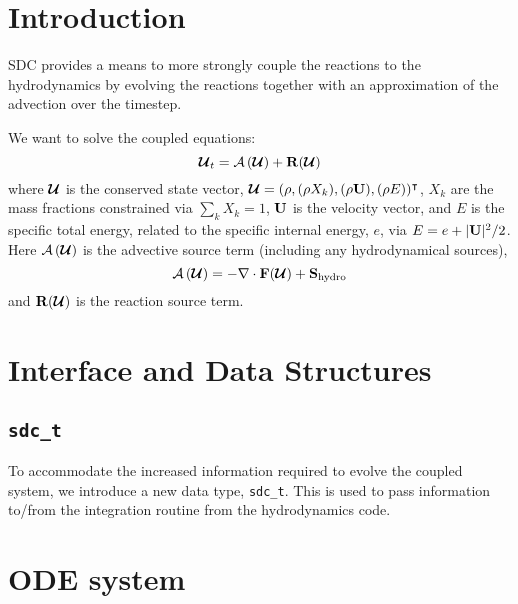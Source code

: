 \section{Introduction}

SDC provides a means to more strongly couple the reactions to the
hydrodynamics by evolving the reactions together with an approximation
of the advection over the timestep.

We want to solve the coupled equations:
\begin{equation}
{\bm{\mathcal{U}}}_t = {\mathcal{A} \left({\bm{\mathcal{U}}}\right)} + {\bf R}({\bm{\mathcal{U}}})
\end{equation}
where ${\bm{\mathcal{U}}}$ is the conserved state vector, ${\bm{\mathcal{U}}} = (\rho, (\rho X_k),
(\rho {\bf U}), (\rho E))^\intercal$, $X_k$ are the mass fractions
constrained via $\sum_k X_k = 1$, ${\bf U}$ is the velocity vector, and
$E$ is the specific total energy, related to the specific internal
energy, $e$, via $E = e + |{\bf U}|^2/2$.  Here ${\mathcal{A} \left({\bm{\mathcal{U}}}\right)}$ is the
advective source term (including any hydrodynamical sources),
\begin{equation}
{\mathcal{A} \left({\bm{\mathcal{U}}}\right)} = - \nabla \cdot \mathbf{F}({\bm{\mathcal{U}}}) + {\bf S}_\mathrm{hydro}
\end{equation}
and ${\bf R}({\bm{\mathcal{U}}})$
is the reaction source term.


\section{Interface and Data Structures}

\subsection{\tt sdc\_t}

To accommodate the increased information required to evolve the
coupled system, we introduce a new data type, {\tt sdc\_t}.  This is
used to pass information to/from the integration routine from the
hydrodynamics code.


\section{ODE system}

